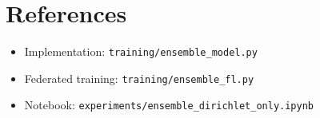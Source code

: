 \documentclass[11pt,a4paper]{article}
\begin{document}
\section{References}

\begin{itemize}
    \item Implementation: \texttt{training/ensemble\_model.py}
    \item Federated training: \texttt{training/ensemble\_fl.py}
    \item Notebook: \texttt{experiments/ensemble\_dirichlet\_only.ipynb}
\end{itemize}
\end{document}
